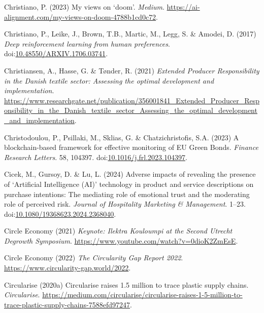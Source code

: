 \documentclass[
  letterpaper,
  DIV=11,
  numbers=noendperiod]{scrartcl}
\newlength{\cslhangindent}
\newenvironment{CSLReferences}[2] %
 {\begin{list}{}{%
  \setlength{\itemindent}{0pt}
  \setlength{\leftmargin}{0pt}
  \setlength{\parsep}{0pt}
  \ifodd #1
   \setlength{\leftmargin}{\cslhangindent}
   \setlength{\itemindent}{-1\cslhangindent}
  \fi
  \setlength{\itemsep}{#2\baselineskip}}}
 {\end{list}}
\begin{document}
\begin{CSLReferences}{0}{1}
Christiano, P. (2023) My views on {`doom'}. \emph{Medium}.
\url{https://ai-alignment.com/my-views-on-doom-4788b1cd0c72}.

Christiano, P., Leike, J., Brown, T.B., Martic, M., Legg, S. \& Amodei,
D. (2017) \emph{Deep reinforcement learning from human preferences}.
doi:\href{https://doi.org/10.48550/ARXIV.1706.03741}{10.48550/ARXIV.1706.03741}.

Christiansen, A., Hasse, G. \& Tønder, R. (2021) \emph{Extended
{Producer Responsibility} in the {Danish} textile sector: {Assessing}
the optimal development and implementation}.
\url{https://www.researchgate.net/publication/356001841_Extended_Producer_Responsibility_in_the_Danish_textile_sector_Assessing_the_optimal_development_and_implementation}.

Christodoulou, P., Psillaki, M., Sklias, G. \& Chatzichristofis, S.A.
(2023) A blockchain-based framework for effective monitoring of {EU
Green Bonds}. \emph{Finance Research Letters}. 58, 104397.
doi:\href{https://doi.org/10.1016/j.frl.2023.104397}{10.1016/j.frl.2023.104397}.

Cicek, M., Gursoy, D. \& Lu, L. (2024) Adverse impacts of revealing the
presence of {`{Artificial Intelligence} ({AI})'} technology in product
and service descriptions on purchase intentions: The mediating role of
emotional trust and the moderating role of perceived risk. \emph{Journal
of Hospitality Marketing \& Management}. 1--23.
doi:\href{https://doi.org/10.1080/19368623.2024.2368040}{10.1080/19368623.2024.2368040}.

Circle Economy (2021) \emph{Keynote: {Ilektra Kouloumpi} at the {Second
Utrecht Degrowth Symposium}}.
\url{https://www.youtube.com/watch?v=0dioK2ZmEsE}.

Circle Economy (2022) \emph{The {Circularity Gap Report} 2022}.
\url{https://www.circularity-gap.world/2022}.

Circularise (2020a) Circularise raises {\texteuro}1.5 million to trace
plastic supply chains. \emph{Circularise}.
\url{https://medium.com/circularise/circularise-raises-1-5-million-to-trace-plastic-supply-chains-7588efd97247}.


\end{CSLReferences}
\end{document}
